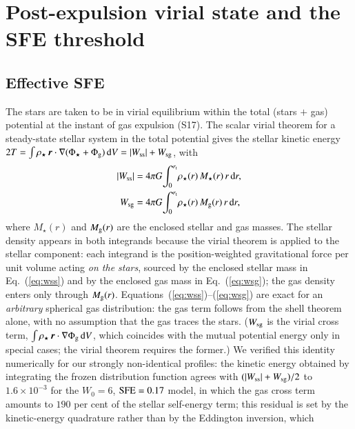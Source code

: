 \documentclass{aa}
\newcommand{\sfe}{{\rm SFE}}
\newcommand{\rtid}{r_{\rm t}}
\begin{document}
\section{Post-expulsion virial state and the SFE threshold}
\label{sec:virial}

\subsection{Effective SFE}
\label{sec:esfe}

The stars are taken to be in virial equilibrium within the total
(stars $+$ gas) potential at the instant of gas expulsion (S17). The
scalar virial theorem for a steady-state stellar system in the total
potential gives the stellar kinetic energy
$2T=\int\rho_\star\,\boldsymbol{r}\cdot\nabla(\Phi_\star+\Phi_{\rm g})\,
{\rm d}V=|W_{\rm ss}|+W_{\rm sg}$, with
\begin{align}
  |W_{\rm ss}| &= 4\pi G\!\int_0^{\rtid}\!\rho_\star(r)\,M_\star(r)\,r\,{\rm d}r,
  \label{eq:wss}\\
  W_{\rm sg} &= 4\pi G\!\int_0^{\rtid}\!\rho_\star(r)\,M_{\rm g}(r)\,r\,{\rm d}r,
  \label{eq:wsg}
\end{align}
where $M_\star(r)$ and $M_{\rm g}(r)$ are the enclosed stellar and gas
masses. The stellar density appears in both integrands because the
virial theorem is applied to the stellar component: each integrand is
the position-weighted gravitational force per unit volume acting
\emph{on the stars}, sourced by the enclosed stellar mass in
Eq.~(\ref{eq:wss}) and by the enclosed gas mass in
Eq.~(\ref{eq:wsg}); the gas density enters only through $M_{\rm g}(r)$.
Equations~(\ref{eq:wss})--(\ref{eq:wsg}) are exact for an
\emph{arbitrary} spherical gas distribution: the gas term follows from
the shell theorem alone, with no assumption that the gas traces the
stars. ($W_{\rm sg}$ is the virial cross term,
$\int\rho_\star\,\boldsymbol{r}\cdot\nabla\Phi_{\rm g}\,{\rm d}V$, which
coincides with the mutual potential energy only in special cases; the
virial theorem requires the former.) We verified this identity
numerically for our strongly non-identical profiles: the kinetic energy
obtained by integrating the frozen distribution function agrees with
$(|W_{\rm ss}|+W_{\rm sg})/2$ to $1.6\times10^{-3}$ for the $W_0=6$,
$\sfe=0.17$ model, in which the gas cross term amounts to $190$ per cent
of the stellar self-energy term; this residual is set by the
kinetic-energy quadrature rather than by the Eddington inversion, which
\end{document}
